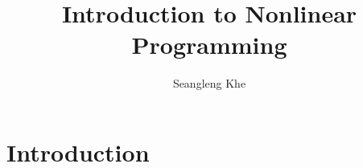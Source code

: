 \documentclass[oneside,oldfontcommands,b5paper,10pt]{memoir}
\title{Introduction to Nonlinear Programming}
\author{Seangleng Khe}
\date{}
\begin{document}
\maketitle \vspace{-1.8cm}

\newpage
\tableofcontents*

\chapter{Introduction}
\end{document}
